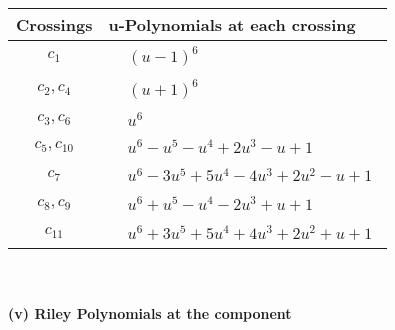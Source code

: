 \documentclass[1p]{elsarticle_modified}
\theoremstyle{definition}
\begin{document}
\begin{tabular}{m{50pt}|m{274pt}}
Crossings & \hspace{64pt}u-Polynomials at each crossing \\
\hline $$\begin{aligned}c_{1}\end{aligned}$$&$\begin{aligned}
&(u-1)^6
\end{aligned}$\\
\hline $$\begin{aligned}c_{2},c_{4}\end{aligned}$$&$\begin{aligned}
&(u+1)^6
\end{aligned}$\\
\hline $$\begin{aligned}c_{3},c_{6}\end{aligned}$$&$\begin{aligned}
&u^6
\end{aligned}$\\
\hline $$\begin{aligned}c_{5},c_{10}\end{aligned}$$&$\begin{aligned}
&u^6- u^5- u^4+2 u^3- u+1
\end{aligned}$\\
\hline $$\begin{aligned}c_{7}\end{aligned}$$&$\begin{aligned}
&u^6-3 u^5+5 u^4-4 u^3+2 u^2- u+1
\end{aligned}$\\
\hline $$\begin{aligned}c_{8},c_{9}\end{aligned}$$&$\begin{aligned}
&u^6+u^5- u^4-2 u^3+u+1
\end{aligned}$\\
\hline $$\begin{aligned}c_{11}\end{aligned}$$&$\begin{aligned}
&u^6+3 u^5+5 u^4+4 u^3+2 u^2+u+1
\end{aligned}$\\
\hline
\end{tabular}\\~\\
\newpage\renewcommand{\arraystretch}{1}
\flushleft \textbf{(v) Riley Polynomials at the component}\newline \\
\end{document}
